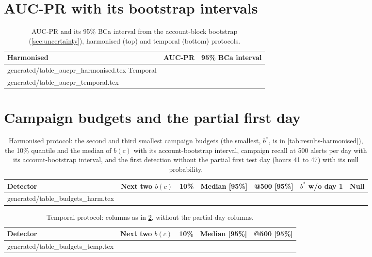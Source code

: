 \documentclass[11pt,a4paper]{article}
\makeatletter
\newcommand{\tablerows}[1]{\@@input #1 }
\makeatother
\begin{document}
\section{AUC-PR with its bootstrap intervals}
\label{app:aucpr}
\begin{table}[H]
\centering
\footnotesize
\caption{AUC-PR and its 95\% BCa interval from the account-block bootstrap (\cref{sec:uncertainty}), harmonised (top) and temporal (bottom) protocols.}
\label{tab:aucpr}
\begin{tabular}{@{}lll@{}}
\toprule
Harmonised & AUC-PR & 95\% BCa interval \\
\midrule
\tablerows{generated/table_aucpr_harmonised.tex}
\midrule
Temporal & & \\
\midrule
\tablerows{generated/table_aucpr_temporal.tex}
\bottomrule
\end{tabular}
\end{table}

\section{Campaign budgets and the partial first day}
\label{app:budgets}
\begin{table}[H]
\centering
\scriptsize
\setlength{\tabcolsep}{2.5pt}
\caption{Harmonised protocol: the second and third smallest campaign budgets (the smallest, $b^{*}$, is in \cref{tab:results-harmonised}), the 10\% quantile and the median of $b(c)$ with its account-bootstrap interval, campaign recall at 500 alerts per day with its account-bootstrap interval, and the first detection without the partial first test day (hours 41 to 47) with its null probability.}
\label{tab:budgets-harm}
\begin{tabular}{@{}llrllrr@{}}
\toprule
Detector & Next two $b(c)$ & 10\% & Median [95\%] & @500 [95\%] & $b^{*}$ w/o day 1 & Null \\
\midrule
\tablerows{generated/table_budgets_harm.tex}
\bottomrule
\end{tabular}
\end{table}
\begin{table}[H]
\centering
\scriptsize
\setlength{\tabcolsep}{2.5pt}
\caption{Temporal protocol: columns as in \cref{tab:budgets-harm}, without the partial-day columns.}
\label{tab:budgets-temp}
\begin{tabular}{@{}llrll@{}}
\toprule
Detector & Next two $b(c)$ & 10\% & Median [95\%] & @500 [95\%] \\
\midrule
\tablerows{generated/table_budgets_temp.tex}
\bottomrule
\end{tabular}
\end{table}
\end{document}
